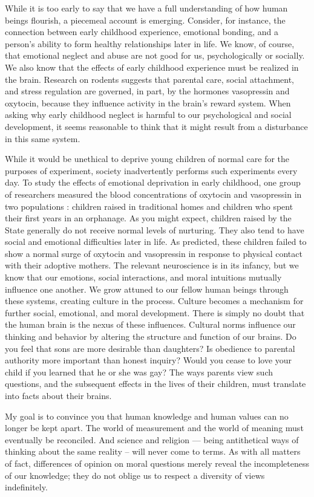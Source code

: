 \documentclass[a4paper,14pt]{extbook}
\begin{document}
While it is too early to say that we have a full understanding of how human beings flourish, a piecemeal account is emerging.
Consider, for instance, the connection between early childhood experience, emotional bonding, and a person's ability to form healthy relationships later in life.
We know, of course, that emotional neglect and abuse are not good for us, psychologically or socially.
We also know that the effects of early childhood experience must be realized in the brain.
Research on rodents suggests that parental care, social attachment, and stress regulation are governed, in part, by the hormones vasopressin and oxytocin, because they influence activity in the brain's reward system.
When asking why early childhood neglect is harmful to our psychological and social development, it seems reasonable to think that it might result from a disturbance in this same system.

While it would be unethical to deprive young children of normal care for the purposes of experiment, society inadvertently performs such experiments every day.
To study the effects of emotional deprivation in early childhood, one group of researchers measured the blood concentrations of oxytocin and vasopressin in two populations :
children raised in traditional homes and children who spent their first years in an orphanage.
As you might expect, children raised by the State generally do not receive normal levels of nurturing.
They also tend to have social and emotional difficulties later in life.
As predicted, these children failed to show a normal surge of oxytocin and vasopressin in response to physical contact with their adoptive mothers.
The relevant neuroscience is in its infancy, but we know that our emotions, social interactions, and moral intuitions mutually influence one another.
We grow attuned to our fellow human beings through these systems, creating culture in the process.
Culture becomes a mechanism for further social, emotional, and moral development.
There is simply no doubt that the human brain is the nexus of these influences.
Cultural norms influence our thinking and behavior by altering the structure and function of our brains.
Do you feel that sons are more desirable than daughters?
Is obedience to parental authority more important than honest inquiry?
Would you cease to love your child if you learned that he or she was gay?
The ways parents view such questions, and the subsequent effects in the lives of their children, must translate into facts about their brains.

My goal is to convince you that human knowledge and human values can no longer be kept apart.
The world of measurement and the world of meaning must eventually be reconciled.
And science and religion --- being antithetical ways of thinking about the same reality -- will never come to terms.
As with all matters of fact, differences of opinion on moral questions merely reveal the incompleteness of our knowledge;
they do not oblige us to respect a diversity of views indefinitely.
\end{document}
